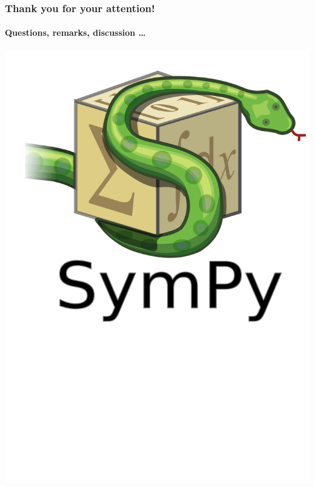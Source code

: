 \documentclass{beamer}
\begin{document}
\begin{frame}
    \frametitle{Thank you for your attention!}
    \framesubtitle{Questions, remarks, discussion \ldots}

    \begin{center}
        \includegraphics[scale=0.2]{images/sympy-logo.pdf}
    \end{center}
\end{frame}
\end{document}
